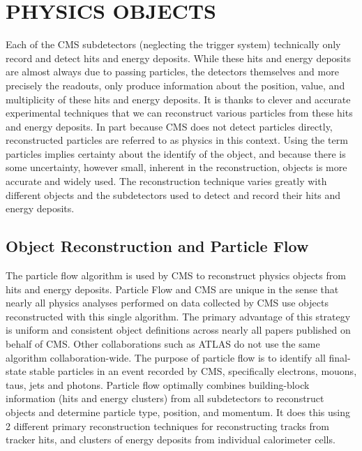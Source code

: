 %
%

\chapter{PHYSICS OBJECTS}
Each of the CMS subdetectors (neglecting the trigger system) technically only record and detect hits and energy deposits. While these hits and energy deposits are almost
always due to passing particles, the detectors themselves and more precisely the readouts, only produce information about the position, value, and multiplicity of
these hits and energy deposits. It is thanks to clever and accurate experimental techniques that we can reconstruct various particles from these hits and energy deposits.
In part because CMS does not detect particles directly, reconstructed particles are referred to as physics  in this context. Using
the term particles implies certainty about the identify of the object, and because there is some uncertainty, however small, inherent in the reconstruction, objects is
more accurate and widely used. The reconstruction technique varies greatly with different objects and the subdetectors used to detect and record their hits and energy
deposits. 

\section{Object Reconstruction and Particle Flow}
The particle flow algorithm is used by CMS to reconstruct physics objects from hits and energy deposits. Particle Flow and CMS are unique in the sense
that nearly all physics analyses performed on data collected by CMS use objects reconstructed with this single algorithm. The primary advantage of this strategy is
uniform and consistent object definitions across nearly all papers published on behalf of CMS. Other collaborations such as ATLAS do not use
the same algorithm collaboration-wide. The purpose of particle flow is to identify all final-state stable particles in an event recorded by CMS, specifically electrons,
mouons, taus, jets and photons. Particle flow optimally combines building-block information (hits and energy clusters) from all subdetectors to reconstruct objects and
determine particle type, position, and momentum. It does this using 2 different primary reconstruction techniques for reconstructing tracks from tracker hits, and clusters
of energy deposits from individual calorimeter cells. 


